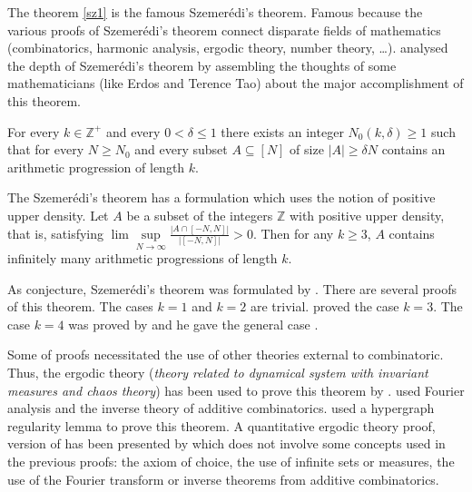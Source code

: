 The  theorem \eqref{sz1} is the famous Szemerédi’s theorem. Famous because the various proofs of Szemerédi's theorem connect disparate fields of mathematics (combinatorics, harmonic analysis, ergodic theory,  number theory, \ldots). \cite{arana2015depth} analysed the depth of Szemerédi's theorem by 
assembling the thoughts of some mathematicians (like Erdos and Terence Tao) about the major accomplishment of this theorem.

\begin{thm}	For every  $k \in \mathbb{Z}^+$ and every $0< \delta \leq  1$ there exists an integer $N_0(k,\delta) \geq 1$ such that for every $N \geq N_0$ and every subset $A \subseteq [N]$ of size $|A|\geq \delta N$ contains an arithmetic progression of length $k.$  \label{sz1} \end{thm}

The Szemerédi's theorem has a formulation which uses the notion of positive upper density. Let $A$ be a subset of the integers $\mathbb{Z}$ with positive upper density, that is, satisfying $\lim \sup\limits_{N\rightarrow \infty} \frac{|A \cap[-N,N]|}{|[-N,N]|} > 0.$
Then for any $k \geq  3$, $A$ contains infinitely many arithmetic progressions of length $k.$

As conjecture, Szemerédi's theorem was formulated by \cite{JLMS}. There are several proofs of this theorem. The cases $k=1$ and $k=2$ are trivial. \cite{roth1953certain, roth1970irregularities} proved the case $k=3.$ The case $k=4$ was proved by \cite{szemeredi1969sets} and he gave the general case \citep{szemeredi1975sets}.

Some of proofs necessitated the use of other theories external to combinatoric. Thus, the ergodic theory (\textit{theory related to dynamical system with invariant measures and chaos theory})  has been used to prove this theorem by \cite{furstenberg1977ergodic, furstenberg1982ergodic}.
\cite{gowers1998fourier, gowers2001new}  used Fourier analysis and the inverse theory of additive  combinatorics. \cite{gowers2007hypergraph} used a hypergraph regularity lemma to prove this theorem. A  quantitative ergodic theory proof, version of \cite{furstenberg1982ergodic} has been presented  by \cite{tao2006quantitative} which does not involve some concepts used in the previous proofs: the axiom of choice, the use of infinite sets or measures, the use of the Fourier transform or inverse theorems from additive combinatorics.

